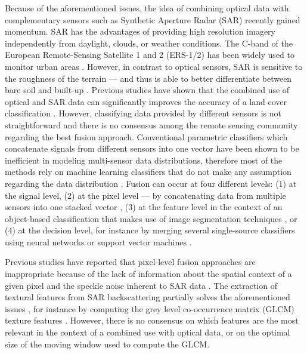 \documentclass[remotesensing,article,submit,moreauthors,pdftex,10pt,a4paper]{Definitions/mdpi}
\begin{document}
Because of the aforementioned issues, the idea of combining optical data with
complementary sensors such as Synthetic Aperture Radar (SAR) recently gained
momentum. SAR has the advantages of providing high resolution imagery
independently from daylight, clouds, or weather conditions. The C-band of the
European Remote-Sensing Satellite 1 and 2 (ERS-1/2) has been widely used to
monitor urban areas \cite{Weng2014a}. However, in contrast to optical sensors,
SAR is sensitive to the roughness of the terrain --- and thus is able to better
differentiate between bare soil and built-up \cite{Soergel2010}. Previous
studies have shown that the combined use of optical and SAR data can
significantly improves the accuracy of a land cover classification
\cite{Waske2008, Zhang2012, Joshi2016}. However, classifying data provided by
different sensors is not straightforward and there is no consensus among the
remote sensing community regarding the best fusion approach. Conventional
parametric classifiers which concatenate signals from different sensors into one
vector have been shown to be inefficient in modeling multi-sensor data
distributions, therefore most of the methods rely on machine learning
classifiers that do not make any assumption regarding the data distribution
\cite{Tupin2010}. Fusion can occur at four different levels: (1) at the signal
level, (2) at the pixel level --- by concatenating data from multiple sensors
into one stacked vector \cite{Griffiths2010, Zhu2012a, Zhang2014b, Braun2015},
(3) at the feature level in the context of an object-based classification that
makes use of image segmentation techniques \cite{Clerici2017}, or (4) at the
decision level, for instance by merging several single-source classifiers using
neural networks or support vector machines \cite{Benediktsson1999, Fauvel2006,
Waske2008, Shao2016}.

Previous studies have reported that pixel-level fusion approaches are
inappropriate because of the lack of information about the spatial context of a
given pixel and the speckle noise inherent to SAR data \cite{Tupin2010,
Gamba2014, Zhang2014b}. The extraction of textural features from SAR
backscattering partially solves the aforementioned issues \cite{Zhang2014b,
Braun2015}, for instance by computing the grey level co-occurrence matrix (GLCM)
texture features \cite{Haralick1973, Gotlieb1990}. However, there is no
consensus on which features are the most relevant in the context of a combined
use with optical data, or on the optimal size of the moving window used to
compute the GLCM.
\end{document}
